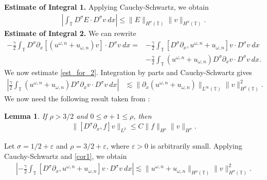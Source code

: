 \documentclass[12pt,reqno]{amsart}
\newcommand{\p}{\partial}
\newcommand{\ci}{\mathbb{T}}
\newcommand{\ee}{\varepsilon}
\theoremstyle{plain}  %
\newtheorem{lemma}{Lemma}
\theoremstyle{definition}
\begin{document}
{\bf Estimate of Integral 1.} Applying Cauchy-Schwartz, we obtain
%
%
\begin{equation}
\begin{split}
\left |\int_{\ci} D^\sigma E \cdot D^\sigma v \ dx \right |
 \le \|E\|_{H^\sigma(\ci)} \|v\|_{H^\sigma(\ci)}.
\label{est_for_1}
\end{split}
\end{equation}
%
%
%
{\bf Estimate of Integral 2.} We can rewrite
%
%
\begin{equation}
\begin{split}
-\frac{\gamma}{2} \int_{\ci} D^\sigma \p_x \left[ \left( u^{\omega,n} + 
u_{\omega,n}
\right)v \right] \cdot D^\sigma v \ dx
 = & -\frac{\gamma}{2}\int_{\ci} \left[ D^\sigma \p_x , u^{\omega,n} + 
u_{\omega,n}
\right]v \cdot D^\sigma v \ dx
\\
& - \frac{\gamma}{2} \int_{\ci} (u^{\omega,n} + u_{\omega,n})
D^\sigma \p_x v \cdot
D^\sigma v \ dx.
\label{est_for_2}
\end{split}
\end{equation}
%
%
We now estimate \eqref{est_for_2}. Integration 
by parts and Cauchy-Schwartz gives 
%
%
\begin{equation}
\begin{split}
\left | \frac{\gamma}{2} \int_{\ci} (u^{\omega,n} + u_{\omega,n})
D^\sigma \p_x v \cdot
D^\sigma v \ dx \right |
& \lesssim \|\p_x(u^{\omega,n} + u_{\omega,n}) \|_{L^\infty(\ci)}
\|v\|_{H^\sigma(\ci)}^2.
\label{2'}
\end{split}
\end{equation}
%
%
 We now need the following result
 taken from \cite{Himonas_2009_Non-uniform-dep-per}:
%
\begin{lemma}
\label{cor1}
If $\rho > 3/2$ and $0 \le \sigma + 1 \le \rho$, then
%
%
\begin{equation}
\begin{split}
\|[D^\sigma \p_x ,f]v\|_{L^2} \le C \|f\|_{H^\rho} \|v\|_{H^\sigma}.
\label{15}
\end{split}
\end{equation}
%
%
\end{lemma}
%
Let $\sigma = 1/2 + \ee$ and $\rho = 3/2 + \ee$, where 
$\ee > 0$ is
arbitrarily small. Applying Cauchy-Schwartz and \autoref{cor1}, we obtain 
%
%
%
%
%
\begin{equation}
\begin{split}
\left | -\frac{\gamma}{2} \int_{\ci} [D^\sigma \p_x , u^{\omega,n} + 
u_{\omega,n}]v
\cdot D^\sigma v \ dx \right | \lesssim \|u^{\omega,n} +
u_{\omega,n}\|_{H^{\rho}(\ci)} \|v\|_{H^\sigma(\ci)}^2.
\label{7}
\end{split}
\end{equation}
\end{document}
